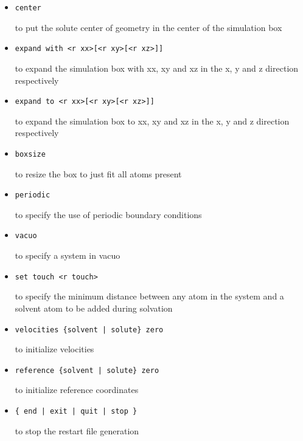 \begin{itemize}
\item
\begin{verbatim}
center
\end{verbatim}
to put the solute center of geometry in the center of the
simulation box

\item
\begin{verbatim}
expand with <r xx>[<r xy>[<r xz>]]
\end{verbatim}
to expand the simulation box with xx, xy and xz in the
x, y and z direction respectively

\item
\begin{verbatim}
expand to <r xx>[<r xy>[<r xz>]]
\end{verbatim}
to expand the simulation box to xx, xy and xz in the
x, y and z direction respectively

\item
\begin{verbatim}
boxsize
\end{verbatim}
to resize the box to just fit all atoms present

\item
\begin{verbatim}
periodic
\end{verbatim}
to specify the use of periodic boundary conditions

\item
\begin{verbatim}
vacuo
\end{verbatim}
to specify a system in vacuo

\item
\begin{verbatim}
set touch <r touch>
\end{verbatim}
to specify the minimum distance between any atom in
the system and a solvent atom to be added during solvation

\item
\begin{verbatim}
velocities {solvent | solute} zero
\end{verbatim}
to initialize velocities

\item
\begin{verbatim}
reference {solvent | solute} zero
\end{verbatim}
to initialize reference coordinates

\item
\begin{verbatim}
{ end | exit | quit | stop }
\end{verbatim}
to stop the restart file generation
\end{itemize}
